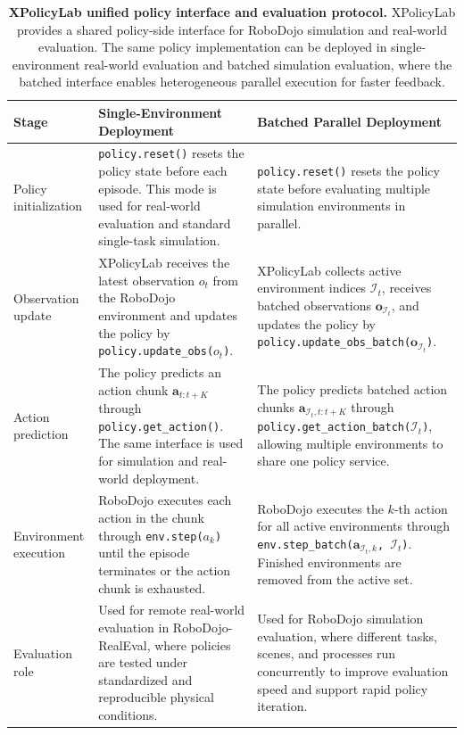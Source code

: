 
\begin{table}[t]
\centering
\caption{\textbf{\textcolor{Blue_1}{XPolicyLab unified policy interface and evaluation protocol.}}
XPolicyLab provides a shared policy-side interface for RoboDojo simulation and real-world evaluation. 
The same policy implementation can be deployed in single-environment real-world evaluation and batched simulation evaluation, where the batched interface enables heterogeneous parallel execution for faster feedback.}
\label{tab:xpolicylab_eval_protocol}
\small
\setlength{\tabcolsep}{5pt}
\renewcommand{\arraystretch}{1.18}
\begin{tabularx}{\textwidth}{p{}X X}
\toprule
\textbf{\textcolor{Blue_1}{Stage}} 
& \textbf{\textcolor{Blue_1}{Single-Environment Deployment}} 
& \textbf{\textcolor{Blue_1}{Batched Parallel Deployment}} \\
\midrule

Policy initialization
& \texttt{policy.reset()} resets the policy state before each episode. This mode is used for real-world evaluation and standard single-task simulation. 
& \texttt{policy.reset()} resets the policy state before evaluating multiple simulation environments in parallel. \\

Observation update
& XPolicyLab receives the latest observation $o_t$ from the RoboDojo environment and updates the policy by \texttt{policy.update\_obs($o_t$)}. 
& XPolicyLab collects active environment indices $\mathcal{I}_t$, receives batched observations $\mathbf{o}_{\mathcal{I}_t}$, and updates the policy by \texttt{policy.update\_obs\_batch($\mathbf{o}_{\mathcal{I}_t}$)}. \\

Action prediction
& The policy predicts an action chunk $\mathbf{a}_{t:t+K}$ through \texttt{policy.get\_action()}. The same interface is used for simulation and real-world deployment. 
& The policy predicts batched action chunks $\mathbf{a}_{\mathcal{I}_t,t:t+K}$ through \texttt{policy.get\_action\_batch($\mathcal{I}_t$)}, allowing multiple environments to share one policy service. \\

Environment execution
& RoboDojo executes each action in the chunk through \texttt{env.step($a_k$)} until the episode terminates or the action chunk is exhausted. 
& RoboDojo executes the $k$-th action for all active environments through \texttt{env.step\_batch($\mathbf{a}_{\mathcal{I}_t,k}$, $\mathcal{I}_t$)}. Finished environments are removed from the active set. \\

Evaluation role
& Used for remote real-world evaluation in RoboDojo-RealEval, where policies are tested under standardized and reproducible physical conditions. 
& Used for RoboDojo simulation evaluation, where different tasks, scenes, and processes run concurrently to improve evaluation speed and support rapid policy iteration. \\

\bottomrule
\end{tabularx}
\end{table}
